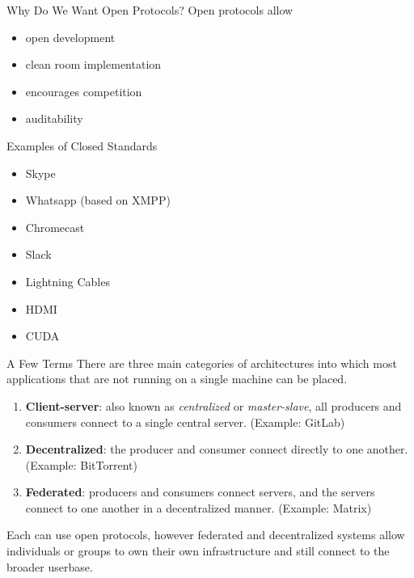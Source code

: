 \documentclass{acm}
\begin{document}
\begin{frame}{Why Do We Want Open Protocols?}
    Open protocols allow
    \begin{itemize}
        \item open development
        \item clean room implementation
        \item encourages competition
        \item auditability
    \end{itemize}
\end{frame}

\begin{frame}{Examples of Closed Standards}
        \begin{itemize}
                \item Skype
                        \pause
                \item Whatsapp (based on XMPP)
                        \pause
                \item Chromecast
                        \pause
                \item Slack
                        \pause
                \item Lightning Cables
                        \pause
                \item HDMI
                        \pause
                \item CUDA
        \end{itemize}
\end{frame}

\begin{frame}{A Few Terms}
    There are three main categories of architectures into which most
    applications that are not running on a single machine can be placed.
    \pause

    \begin{enumerate}
        \item \textbf{Client-server}: also known as \textit{centralized} or
            \textit{master-slave}, all producers and consumers connect to a
            single central server. (Example: GitLab)
        \item \textbf{Decentralized}: the producer and consumer connect directly
            to one another. (Example: BitTorrent)
        \item \textbf{Federated}: producers and consumers connect servers,
            and the servers connect to one another in a decentralized manner.
            (Example: Matrix)
    \end{enumerate}
    \pause

    Each can use open protocols, however federated and decentralized systems
    allow individuals or groups to own their own infrastructure and still
    connect to the broader userbase.
\end{frame}
\end{document}
